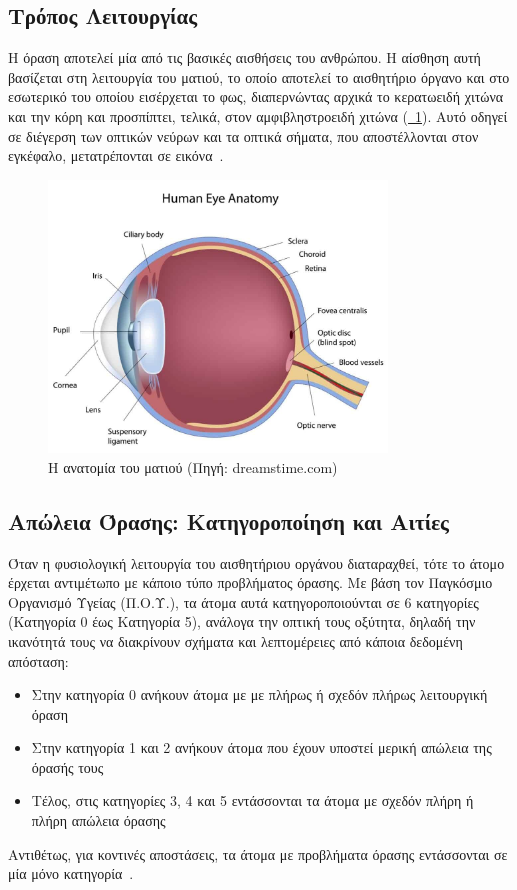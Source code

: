 \subsection{Τρόπος Λειτουργίας}\label{subsec:visionDefinition}
Η όραση αποτελεί μία από τις βασικές αισθήσεις του ανθρώπου. Η αίσθηση αυτή βασίζεται στη λειτουργία του ματιού, το οποίο αποτελεί το αισθητήριο όργανο και στο εσωτερικό του οποίου εισέρχεται το φως, διαπερνώντας αρχικά το κερατωειδή χιτώνα και την κόρη και προσπίπτει, τελικά, στον αμφιβληστροειδή χιτώνα (\hyperref[fig:eye_anatomy]{\schema~\ref*{fig:eye_anatomy}}). Αυτό οδηγεί σε διέγερση των οπτικών νεύρων και τα οπτικά σήματα, που αποστέλλονται στον εγκέφαλο, μετατρέπονται σε εικόνα~\cite{nationaleyeinstitute_2022_how}\cite{anspaugh_2022_vision}.

\begin{figure}[!h]
  \centering
  \includegraphics[width=90mm]{images/eye_anatomy.jpg}
  \caption{Η ανατομία του ματιού {\footnotesize(Πηγή: dreamstime.com)}}\label{fig:eye_anatomy}
\end{figure}

\subsection{Απώλεια Όρασης: Κατηγοροποίηση και Αιτίες}\label{subsec:visionCauses}
Όταν η φυσιολογική λειτουργία του αισθητήριου οργάνου διαταραχθεί, τότε το άτομο έρχεται αντιμέτωπο με κάποιο τύπο προβλήματος όρασης. Με βάση τον Παγκόσμιο Οργανισμό Υγείας (Π.Ο.Υ.), τα άτομα αυτά κατηγοροποιούνται σε 6 κατηγορίες (Κατηγορία 0 έως Κατηγορία 5), ανάλογα την οπτική τους οξύτητα, δηλαδή την ικανότητά τους να διακρίνουν σχήματα και λεπτομέρειες από κάποια δεδομένη απόσταση:
\begin{itemize}
    \item Στην κατηγορία 0 ανήκουν άτομα με με πλήρως ή σχεδόν πλήρως λειτουργική όραση
    \item Στην κατηγορία 1 και 2 ανήκουν άτομα που έχουν υποστεί μερική απώλεια της όρασής τους
    \item Τέλος, στις κατηγορίες 3, 4 και 5 εντάσσονται τα άτομα με σχεδόν πλήρη ή πλήρη απώλεια όρασης
\end{itemize}
Αντιθέτως, για κοντινές αποστάσεις, τα άτομα με προβλήματα όρασης εντάσσονται σε μία μόνο κατηγορία~\cite{worldhealthorganization_2019_world}.

